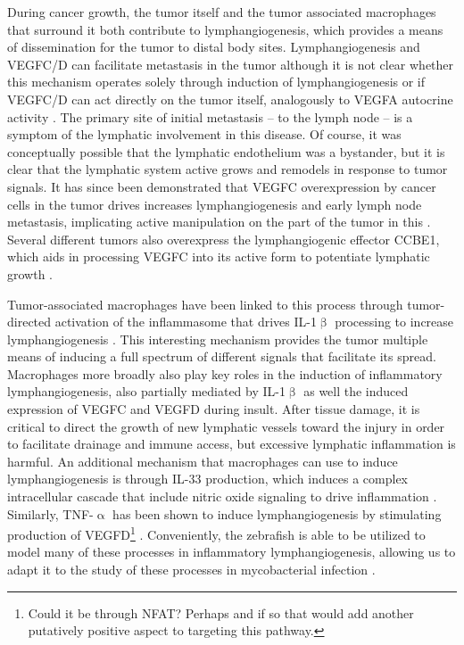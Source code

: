 During cancer growth, the tumor itself and the tumor associated macrophages that surround it both contribute to lymphangiogenesis, which provides a means of dissemination for the tumor to distal body sites. Lymphangiogenesis and VEGFC/D can facilitate metastasis in the tumor although it is not clear whether this mechanism operates solely through induction of lymphangiogenesis or if VEGFC/D can act directly on the tumor itself, analogously to VEGFA autocrine activity \citep{Stacker2014}. The primary site of initial metastasis -- to the lymph node -- is a symptom of the lymphatic involvement in this disease. Of course, it was conceptually possible that the lymphatic endothelium was a bystander, but it is clear that the lymphatic system active grows and remodels in response to tumor signals. It has since been demonstrated that VEGFC overexpression by cancer cells in the tumor drives increases lymphangiogenesis and early lymph node metastasis, implicating active manipulation on the part of the tumor in this \citep{Duong2012}. Several different tumors also overexpress the lymphangiogenic effector CCBE1, which aids in processing VEGFC into its active form to potentiate lymphatic growth \citep{Hogan2009, LeGuen2014, Li2018b, Song2020, Zhao2018}.

Tumor-associated macrophages have been linked to this process through tumor-directed activation of the inflammasome that drives IL-1$\upbeta$ processing to increase lymphangiogenesis \citep{Weichand2017}. This interesting mechanism provides the tumor multiple means of inducing a full spectrum of different signals that facilitate its spread. Macrophages more broadly also play key roles in the induction of inflammatory lymphangiogenesis, also partially mediated by IL-1$\upbeta$ as well the induced expression of VEGFC and VEGFD during insult. After tissue damage, it is critical to direct the growth of new lymphatic vessels toward the injury in order to facilitate drainage and immune access, but excessive lymphatic inflammation is harmful. An additional mechanism that macrophages can use to induce lymphangiogenesis is through IL-33 production, which induces a complex intracellular cascade that include nitric oxide signaling to drive inflammation \citep{Han2017}. Similarly, TNF-$\upalpha$ has been shown to induce lymphangiogenesis by stimulating production of VEGFD\footnote{Could it be through NFAT? Perhaps and if so that would add another putatively positive aspect to targeting this pathway.} \citep{Hong2016}. Conveniently, the zebrafish is able to be utilized to model many of these processes in inflammatory lymphangiogenesis, allowing us to adapt it to the study of these processes in mycobacterial infection \citep{Okuda2015}.

